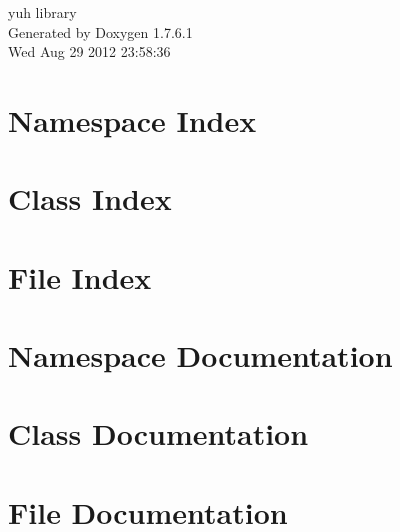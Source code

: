 \documentclass[a4paper]{book}
\begin{document}
\hypersetup{pageanchor=false,citecolor=blue}
\begin{titlepage}
\vspace*{7cm}
\begin{center}
{\Large yuh library }\\
\vspace*{1cm}
{\large \-Generated by Doxygen 1.7.6.1}\\
\vspace*{0.5cm}
{\small Wed Aug 29 2012 23:58:36}\\
\end{center}
\end{titlepage}
\clearemptydoublepage
{}
\tableofcontents
\clearemptydoublepage
{}
\hypersetup{pageanchor=true,citecolor=blue}
\chapter{\-Namespace \-Index}

\chapter{\-Class \-Index}

\chapter{\-File \-Index}

\chapter{\-Namespace \-Documentation}




\chapter{\-Class \-Documentation}















\chapter{\-File \-Documentation}














\printindex
\end{document}
